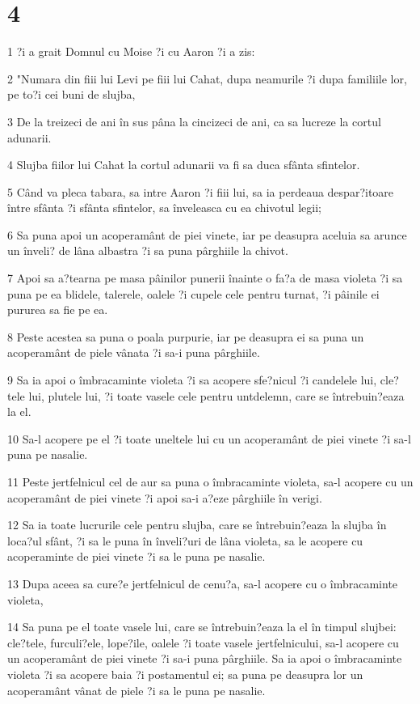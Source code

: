 \chapter{4}

\par 1 ?i a grait Domnul cu Moise ?i cu Aaron ?i a zis:
\par 2 "Numara din fiii lui Levi pe fiii lui Cahat, dupa neamurile ?i dupa familiile lor, pe to?i cei buni de slujba,
\par 3 De la treizeci de ani în sus pâna la cincizeci de ani, ca sa lucreze la cortul adunarii.
\par 4 Slujba fiilor lui Cahat la cortul adunarii va fi sa duca sfânta sfintelor.
\par 5 Când va pleca tabara, sa intre Aaron ?i fiii lui, sa ia perdeaua despar?itoare între sfânta ?i sfânta sfintelor, sa înveleasca cu ea chivotul legii;
\par 6 Sa puna apoi un acoperamânt de piei vinete, iar pe deasupra aceluia sa arunce un înveli? de lâna albastra ?i sa puna pârghiile la chivot.
\par 7 Apoi sa a?tearna pe masa pâinilor punerii înainte o fa?a de masa violeta ?i sa puna pe ea blidele, talerele, oalele ?i cupele cele pentru turnat, ?i pâinile ei pururea sa fie pe ea.
\par 8 Peste acestea sa puna o poala purpurie, iar pe deasupra ei sa puna un acoperamânt de piele vânata ?i sa-i puna pârghiile.
\par 9 Sa ia apoi o îmbracaminte violeta ?i sa acopere sfe?nicul ?i candelele lui, cle?tele lui, plutele lui, ?i toate vasele cele pentru untdelemn, care se întrebuin?eaza la el.
\par 10 Sa-l acopere pe el ?i toate uneltele lui cu un acoperamânt de piei vinete ?i sa-l puna pe nasalie.
\par 11 Peste jertfelnicul cel de aur sa puna o îmbracaminte violeta, sa-l acopere cu un acoperamânt de piei vinete ?i apoi sa-i a?eze pârghiile în verigi.
\par 12 Sa ia toate lucrurile cele pentru slujba, care se întrebuin?eaza la slujba în loca?ul sfânt, ?i sa le puna în înveli?uri de lâna violeta, sa le acopere cu acoperaminte de piei vinete ?i sa le puna pe nasalie.
\par 13 Dupa aceea sa cure?e jertfelnicul de cenu?a, sa-l acopere cu o îmbracaminte violeta,
\par 14 Sa puna pe el toate vasele lui, care se întrebuin?eaza la el în timpul slujbei: cle?tele, furculi?ele, lope?ile, oalele ?i toate vasele jertfelnicului, sa-l acopere cu un acoperamânt de piei vinete ?i sa-i puna pârghiile. Sa ia apoi o îmbracaminte violeta ?i sa acopere baia ?i postamentul ei; sa puna pe deasupra lor un acoperamânt vânat de piele ?i sa le puna pe nasalie.

